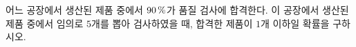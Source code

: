어느 공장에서 생산된 제품 중에서 $90\mkern3mu \%$가 품질 검사에 합격한다. 이 공장에서 생산된 제품 중에서 임의로 $5$개를 뽑아 검사하였을 때, 합격한 제품이 $1$개 이하일 확률을 구하시오.
